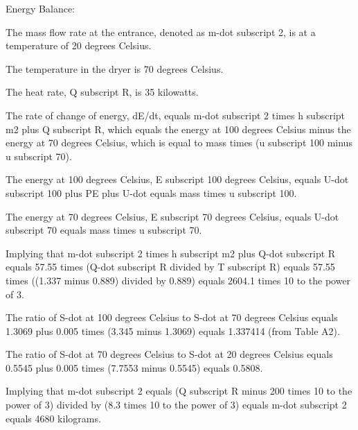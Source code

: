 Energy Balance:

The mass flow rate at the entrance, denoted as m-dot subscript 2, is at a temperature of 20 degrees Celsius.

The temperature in the dryer is 70 degrees Celsius.

The heat rate, Q subscript R, is 35 kilowatts.

The rate of change of energy, dE/dt, equals m-dot subscript 2 times h subscript m2 plus Q subscript R, which equals the energy at 100 degrees Celsius minus the energy at 70 degrees Celsius, which is equal to mass times (u subscript 100 minus u subscript 70).

The energy at 100 degrees Celsius, E subscript 100 degrees Celsius, equals U-dot subscript 100 plus PE plus U-dot equals mass times u subscript 100.

The energy at 70 degrees Celsius, E subscript 70 degrees Celsius, equals U-dot subscript 70 equals mass times u subscript 70.

Implying that m-dot subscript 2 times h subscript m2 plus Q-dot subscript R equals 57.55 times (Q-dot subscript R divided by T subscript R) equals 57.55 times ((1.337 minus 0.889) divided by 0.889) equals 2604.1 times 10 to the power of 3.

The ratio of S-dot at 100 degrees Celsius to S-dot at 70 degrees Celsius equals 1.3069 plus 0.005 times (3.345 minus 1.3069) equals 1.337414 (from Table A2).

The ratio of S-dot at 70 degrees Celsius to S-dot at 20 degrees Celsius equals 0.5545 plus 0.005 times (7.7553 minus 0.5545) equals 0.5808.

Implying that m-dot subscript 2 equals (Q subscript R minus 200 times 10 to the power of 3) divided by (8.3 times 10 to the power of 3) equals m-dot subscript 2 equals 4680 kilograms.